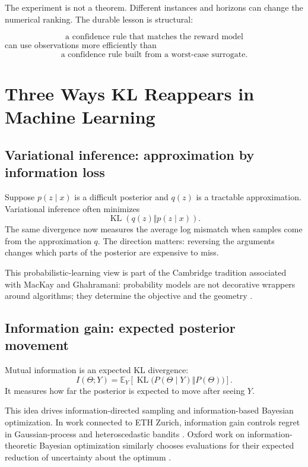 \documentclass[en,nofont,11pt]{elegantbook}
\newcommand{\E}{\mathbb{E}}
\newcommand{\KL}{\operatorname{KL}}
\begin{document}
The experiment is not a theorem. Different instances and horizons can change the numerical ranking. The durable lesson is structural:

\[
\text{a confidence rule that matches the reward model}
\]
can use observations more efficiently than
\[
\text{a confidence rule built from a worst-case surrogate}.
\]

\chapter{Three Ways KL Reappears in Machine Learning}

\section{Variational inference: approximation by information loss}

Suppose $p(z\mid x)$ is a difficult posterior and $q(z)$ is a tractable approximation. Variational inference often minimizes
\[
\KL(q(z)\Vert p(z\mid x)).
\]
The same divergence now measures the average log mismatch when samples come from the approximation $q$. The direction matters: reversing the arguments changes which parts of the posterior are expensive to miss.

This probabilistic-learning view is part of the Cambridge tradition associated with MacKay and Ghahramani: probability models are not decorative wrappers around algorithms; they determine the objective and the geometry \cite{mackay2003information,ghahramani2015probabilistic}.

\section{Information gain: expected posterior movement}

Mutual information is an expected KL divergence:
\[
I(\Theta;Y)
=
\E_Y\left[
\KL\bigl(P(\Theta\mid Y)\Vert P(\Theta)\bigr)
\right].
\]
It measures how far the posterior is expected to move after seeing $Y$.

This idea drives information-directed sampling and information-based Bayesian optimization. In work connected to ETH Zurich, information gain controls regret in Gaussian-process and heteroscedastic bandits \cite{srinivas2010gpucb,kirschner2018information}. Oxford work on information-theoretic Bayesian optimization similarly chooses evaluations for their expected reduction of uncertainty about the optimum \cite{ru2018fast}.
\end{document}
